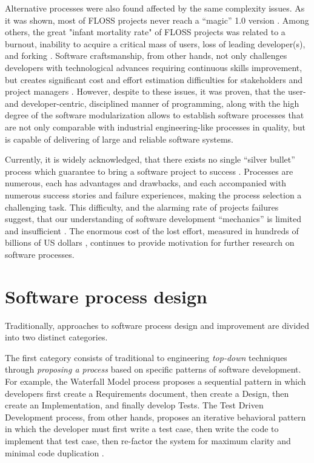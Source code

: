 Alternative processes were also found affected by the same complexity issues.
As it was shown, most of FLOSS projects never reach a ``magic'' 1.0 version \cite{citeulike:12480029}. 
Among others, the great "infant mortality rate" of FLOSS projects was related to a burnout, 
inability to acquire a critical mass of users, loss of leading developer(s), and forking \cite{richter2007critique}. 
Software craftsmanship, from other hands, not only challenges developers with technological advances 
requiring continuous skills improvement, but creates significant cost and effort estimation difficulties for
stakeholders and project managers \cite{citeulike:11058784}. However, despite to these issues, 
it was proven, that the user- and developer-centric, disciplined manner of programming, along with the high 
degree of the software modularization allows to establish software processes that are not only comparable 
with industrial engineering-like processes in quality, but is capable of delivering of large and 
reliable software systems.

Currently, it is widely acknowledged, that there exists no single ``silver bullet'' process which 
guarantee to bring a software project to success \cite{citeulike:1986013}. 
Processes are numerous, each has advantages and drawbacks, and each accompanied with 
numerous success stories and failure experiences, making the process selection a challenging task. 
This difficulty, and the alarming rate of projects failures suggest, that our understanding of software 
development ``mechanics''  is limited and insufficient \cite{citeulike:12550665}. 
The enormous cost of the lost effort, measured in hundreds of billions of US dollars 
\cite{citeulike:2207657} \cite{citeulike:2207653} \cite{citeulike:2207655}, 
continues to provide motivation for further research on software processes. 

%
%
\section{Software process design}\label{section_software_process_design}
Traditionally, approaches to software process design and improvement are divided into two distinct categories. 

The first category consists of traditional to engineering \textit{top-down} techniques through 
\textit{proposing a process} based on specific patterns of software development. 
For example, the Waterfall Model process proposes a sequential pattern in which developers first create a 
Requirements document, then create a Design, then create an Implementation, and finally develop Tests. 
The Test Driven Development process, from other hands, proposes an iterative behavioral pattern in which
the developer must first write a test case, then write the code to implement that test case, then re-factor the 
system for maximum clarity and minimal code duplication \cite{citeulike:6086365}. 

